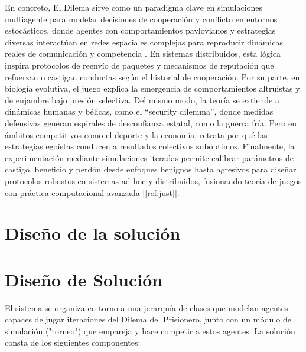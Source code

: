 \documentclass{article}
\begin{document}
En concreto, El Dilema sirve como un paradigma clave en simulaciones multiagente para modelar 
decisiones de cooperación y conflicto en entornos estocásticos, donde agentes con 
comportamientos pavlovianos y estrategias diversas interactúan en redes espaciales complejas 
para reproducir dinámicas reales de comunicación y competencia .
En sistemas distribuidos, esta lógica inspira protocolos de reenvío de paquetes y mecanismos de 
reputación que refuerzan o castigan conductas según el historial de cooperación.
Por su parte, en biología evolutiva, el juego explica la emergencia de comportamientos altruistas 
y de enjambre bajo presión selectiva.
Del mismo modo, la teoría se extiende a dinámicas humanas y bélicas, como el “security dilemma”, 
donde medidas defensivas generan espirales de desconfianza estatal, como la guerra fría. Pero
en ámbitos competitivos como el deporte y la economía, retrata por qué las estrategias 
egoístas conducen a resultados colectivos subóptimos. Finalmente, 
la experimentación mediante simulaciones iteradas permite calibrar parámetros de castigo, 
beneficio y perdón desde enfoques benignos hasta agresivos para diseñar protocolos robustos 
en sistemas ad hoc y distribuidos, fusionando teoría de juegos con práctica 
computacional avanzada [\ref{ref:just}].


\section{Diseño de la solución}\label{sec:dis}

\section*{Diseño de Solución}

El sistema se organiza en torno a una jerarquía de clases que modelan agentes capaces de jugar iteraciones del 
Dilema del Prisionero, junto con un módulo de simulación ("torneo") que empareja y hace competir a estos agentes. 
La solución consta de los siguientes componentes:
\end{document}
